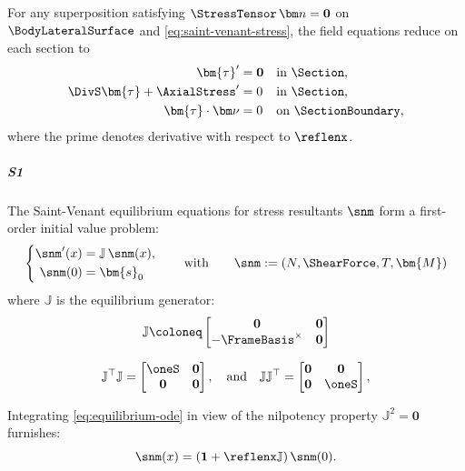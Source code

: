 For any superposition satisfying \(\StressTensor\,\bm n=\mathbf{0}\) on \(\BodyLateralSurface\) and \eqref{eq:saint-venant-stress},
the field equations reduce on each section to
\begin{subequations}
\label{eq:sv-equilibrium}
\begin{align}
\bm{\tau}'&=\mathbf{0} && \text{in }\Section,\\
\DivS\bm{\tau}+\AxialStress'&=0 && \text{in }\Section,\\
\bm{\tau}\cdot\bm\nu&=0 && \text{on }\SectionBoundary,
\end{align}
\end{subequations}
where the prime denotes derivative with respect to \(\reflenx\).
\subparagraph{S1}
The Saint-Venant equilibrium equations for stress resultants 
$\snm$ form a first-order initial value problem:
\begin{equation}
\left\{
\begin{aligned}
\snm'(x) & = \mathbb{J}\,\snm(x), \\
\snm(0) &= \bm{s}_0
\end{aligned}\right.
\qquad\text{with}\qquad 
\snm := (N,\ShearForce,T,\bm{M})
\label{eq:equilibrium-ode}
\end{equation}
where \(\mathbb{J}\) is the equilibrium generator:
\begin{equation}
\mathbb{J} \coloneq \begin{bmatrix}
 \mathbf{0} & \mathbf{0}\\
 -\FrameBasis^\times & \mathbf{0}
\end{bmatrix}
\label{eq:J-matrix}
\end{equation}
\begin{Details}
\[
\mathbb{J}^{\top}\mathbb{J} = \begin{bmatrix}
    \oneS & \mathbf{0} \\
    \mathbf{0} & \mathbf{0}
\end{bmatrix},
\quad\text{and}\quad 
\mathbb{J}\mathbb{J}^{\top} = \begin{bmatrix}
    \mathbf{0} & \mathbf{0} \\
    \mathbf{0} & \oneS
\end{bmatrix},
\]
\end{Details}
Integrating \eqref{eq:equilibrium-ode} in view of the nilpotency property \(\mathbb{J}^2 = \mathbf{0}\) furnishes:
\begin{equation*}
\snm(x) = (\mathbf{1} + \reflenx\mathbb{J})\,\snm(0).
\end{equation*}

